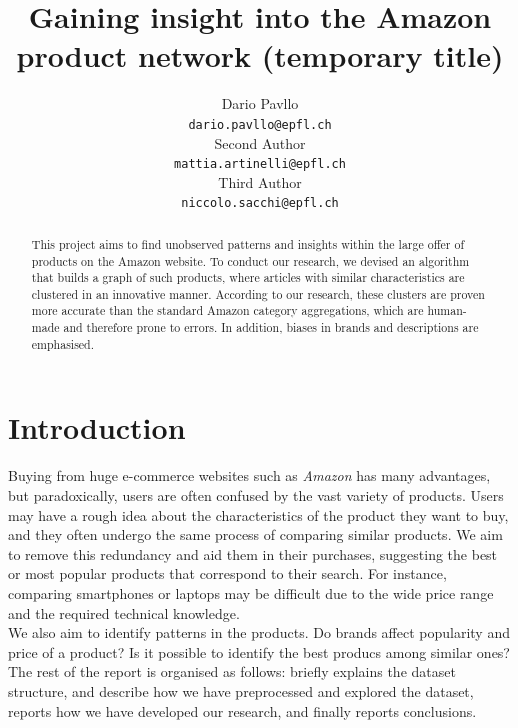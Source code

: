 \documentclass[11pt]{article}
\title{Gaining insight into the Amazon product network (temporary title)}
\author{Dario Pavllo \\
  {\tt dario.pavllo@epfl.ch} \\\And
  Second Author \\
  {\tt mattia.artinelli@epfl.ch} \\\And
Third Author \\
{\tt niccolo.sacchi@epfl.ch} \\}
\date{}
\begin{document}
\maketitle
\begin{abstract}
This project aims to find unobserved patterns and insights within the large offer of products on the Amazon website. To conduct our research, we devised an algorithm that builds a graph of such products, where articles with similar characteristics are clustered in an innovative manner. According to our research, these clusters are proven more accurate than the standard Amazon category aggregations, which are human-made and therefore prone to errors. In addition, biases in brands and descriptions are emphasised.

\end{abstract}

\section{Introduction}
Buying from huge e-commerce websites such as \emph{Amazon} has many advantages, but paradoxically, users are often confused by the vast variety of products. Users may have a rough idea about the characteristics of the product they want to buy, and they often undergo the same process of comparing similar products. We aim to remove this redundancy and aid them in their purchases, suggesting the best or most popular products that correspond to their search. For instance, comparing smartphones or laptops may be difficult due to the wide price range and the required technical knowledge. \\ 
We also aim to identify patterns in the products. Do brands affect popularity and price of a product? Is it possible to identify the best producs among similar ones? 
The rest of the report is organised as follows:  briefly explains the dataset structure,  and  describe how we have preprocessed and explored the dataset,  reports how we have developed our research, and finally  reports conclusions.
\end{document}
